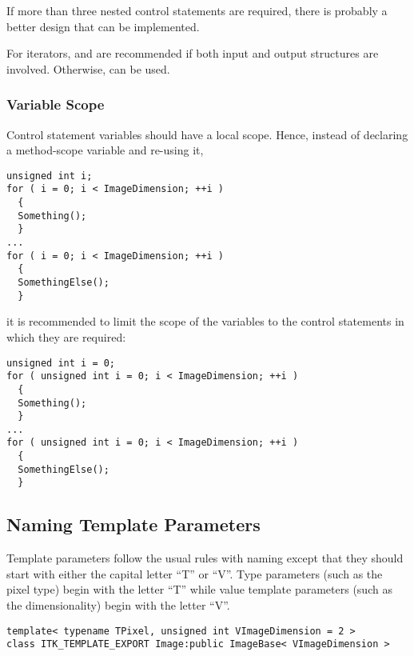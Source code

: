If more than three nested control statements are required, there is probably
a better design that can be implemented.

For iterators,  and  are recommended if both input and
output structures are involved. Otherwise,  can be used.


\subsubsection{Variable Scope}
\label{subsubsec:VariableScope}

Control statement variables should have a local scope. Hence, instead of
declaring a method-scope variable and re-using it,
\small
\begin{verbatim}
unsigned int i;
for ( i = 0; i < ImageDimension; ++i )
  {
  Something();
  }
...
for ( i = 0; i < ImageDimension; ++i )
  {
  SomethingElse();
  }
\end{verbatim}
\normalsize

it is recommended to limit the scope of the variables to the control
statements in which they are required:

\small
\begin{verbatim}
unsigned int i = 0;
for ( unsigned int i = 0; i < ImageDimension; ++i )
  {
  Something();
  }
...
for ( unsigned int i = 0; i < ImageDimension; ++i )
  {
  SomethingElse();
  }
\end{verbatim}
\normalsize


\subsection{Naming Template Parameters}
\label{subsec:NamingTemplateParameters}

Template parameters follow the usual rules with naming except that they should
start with either the capital letter ``T'' or ``V''. Type parameters (such as
the pixel type) begin with the letter ``T'' while value template parameters
(such as the dimensionality) begin with the letter ``V''.

\small
\begin{verbatim}
template< typename TPixel, unsigned int VImageDimension = 2 >
class ITK_TEMPLATE_EXPORT Image:public ImageBase< VImageDimension >
\end{verbatim}
\normalsize

